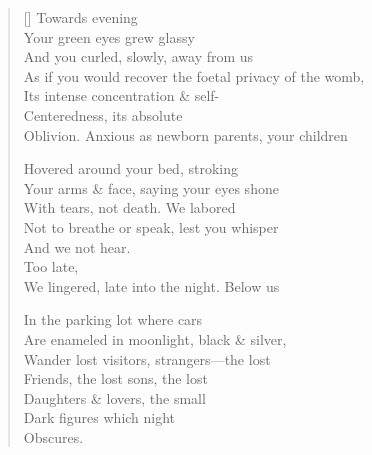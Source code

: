 \settowidth{\versewidth}{Oblivion. \qquad Anxious as newborn parents, your children}
\begin{verse}[\versewidth]
Towards evening\\
Your green eyes grew glassy\\
And you curled, slowly, away from us\\
As if you would recover the foetal privacy of the womb,\\
Its intense concentration \& self-\\
Centeredness, its absolute\\
Oblivion. \qquad Anxious as newborn parents, your children

Hovered around your bed, stroking\\
Your arms \& face, saying your eyes shone\\
With tears, not death. We labored\\
Not to breathe or speak, lest you whisper\\
And we not hear.\\
\hfill Too late,\\
We lingered, late into the night. Below us

In the parking lot where cars\\
Are enameled in moonlight, black \& silver,\\
Wander lost visitors, strangers---the lost\\
Friends, the lost sons, the lost\\
Daughters \& lovers, the small\\
Dark figures which night\\
Obscures.
\end{verse}

